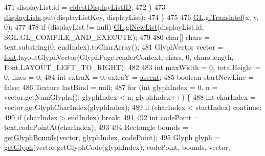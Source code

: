 \begin{DoxyCode}
471                     displayList.id = \mbox{\hyperlink{classorg_1_1newdawn_1_1slick_1_1_unicode_font_a093f0c7469fcdddf31407ca64a9beacd}{eldestDisplayListID}};
472             \}
473             \mbox{\hyperlink{classorg_1_1newdawn_1_1slick_1_1_unicode_font_a66750034039374bef370150798d64f95}{displayLists}}.put(displayListKey, displayList);
474         \}
475 
476         \mbox{\hyperlink{classorg_1_1newdawn_1_1slick_1_1_unicode_font_a00797c33470cfc4443b6c24d7a48c2b1}{GL}}.\mbox{\hyperlink{interfaceorg_1_1newdawn_1_1slick_1_1opengl_1_1renderer_1_1_s_g_l_a647aff6cabd0c83869166144e9aee833}{glTranslatef}}(x, y, 0);
477 
478         \textcolor{keywordflow}{if} (displayList != null) \mbox{\hyperlink{classorg_1_1newdawn_1_1slick_1_1_unicode_font_a00797c33470cfc4443b6c24d7a48c2b1}{GL}}.\mbox{\hyperlink{interfaceorg_1_1newdawn_1_1slick_1_1opengl_1_1renderer_1_1_s_g_l_a85746cd7e0de9297a821619097a5f7cc}{glNewList}}(displayList.id, SGL.GL\_COMPILE\_AND\_EXECUTE);
479 
480         \textcolor{keywordtype}{char}[] chars = text.substring(0, endIndex).toCharArray();
481         GlyphVector vector = \mbox{\hyperlink{classorg_1_1newdawn_1_1slick_1_1_unicode_font_a956ab491839be375d47444a67ebff11c}{font}}.layoutGlyphVector(GlyphPage.renderContext, chars, 0, chars.length, 
      Font.LAYOUT\_LEFT\_TO\_RIGHT);
482 
483         \textcolor{keywordtype}{int} maxWidth = 0, totalHeight = 0, lines = 0;
484         \textcolor{keywordtype}{int} extraX = 0, extraY = \mbox{\hyperlink{classorg_1_1newdawn_1_1slick_1_1_unicode_font_a195706fa1491e793a4b923dd844b594f}{ascent}};
485         \textcolor{keywordtype}{boolean} startNewLine = \textcolor{keyword}{false};
486         Texture lastBind = null;
487         \textcolor{keywordflow}{for} (\textcolor{keywordtype}{int} glyphIndex = 0, n = vector.getNumGlyphs(); glyphIndex < n; glyphIndex++) \{
488             \textcolor{keywordtype}{int} charIndex = vector.getGlyphCharIndex(glyphIndex);
489             \textcolor{keywordflow}{if} (charIndex < startIndex) \textcolor{keywordflow}{continue};
490             \textcolor{keywordflow}{if} (charIndex > endIndex) \textcolor{keywordflow}{break};
491 
492             \textcolor{keywordtype}{int} codePoint = text.codePointAt(charIndex);
493 
494             Rectangle bounds = \mbox{\hyperlink{classorg_1_1newdawn_1_1slick_1_1_unicode_font_a61a42b9754ad2307b80a8699d484a158}{getGlyphBounds}}(vector, glyphIndex, codePoint);
495             Glyph glyph = \mbox{\hyperlink{classorg_1_1newdawn_1_1slick_1_1_unicode_font_a30b90c7e39d5561f93cae92300ed5a22}{getGlyph}}(vector.getGlyphCode(glyphIndex), codePoint, bounds, vector, 

\end{DoxyCode}
